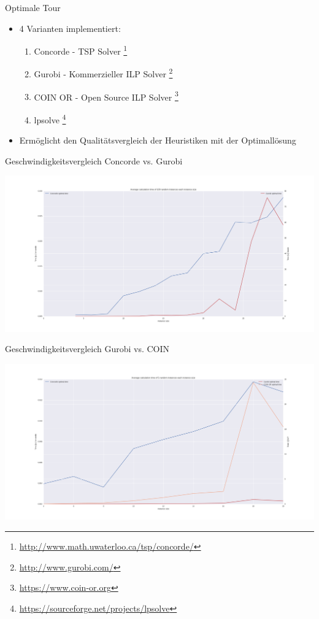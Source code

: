 	\begin{frame}{Optimale Tour}
	\begin{itemize}
	\item 4 Varianten implementiert:
    \begin{enumerate}
    \item Concorde - TSP Solver \footnote[frame] {\scriptsize\url{http://www.math.uwaterloo.ca/tsp/concorde/}}
    \item Gurobi - Kommerzieller ILP Solver \footnote[frame] {\scriptsize\url{http://www.gurobi.com/}}
    \item COIN OR - Open Source ILP Solver \footnote[frame] {\scriptsize\url{https://www.coin-or.org}}
    \item lpsolve \footnote[frame] {\scriptsize\url{https://sourceforge.net/projects/lpsolve}}
    \end{enumerate}
	\end{itemize}
    \begin{itemize}
    	\item Ermöglicht den Qualitätsvergleich der Heuristiken mit der Optimallösung
    \end{itemize}
\end{frame}

\begin{frame}{Geschwindigkeitsvergleich Concorde vs. Gurobi}
\begin{center}
\hspace*{-1cm}%
\includegraphics[width=\dimexpr\textwidth+2cm\relax]{speed_figure_3.png}%
\hspace*{-1cm}%
\end{center}
\end{frame}

\begin{frame}{Geschwindigkeitsvergleich Gurobi vs. COIN}
\begin{center}
\hspace*{-1cm}%
\includegraphics[width=\dimexpr\textwidth+2cm\relax]{speed_figure_4.png}%
\hspace*{-1cm}%
\end{center}
\end{frame}